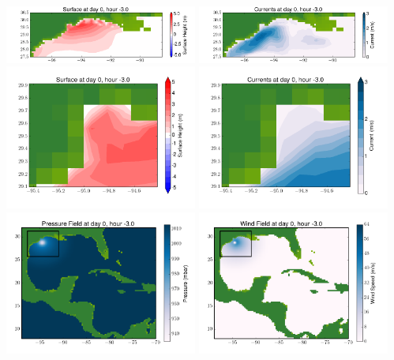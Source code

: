 \documentclass[11pt]{article}
\begin{document}
\includegraphics[width=0.475\textwidth]{frame0069fig4.png}
\vskip 10pt 
\includegraphics[width=0.475\textwidth]{frame0069fig5.png}
\includegraphics[width=0.475\textwidth]{frame0069fig6.png}
\vskip 10pt 
\includegraphics[width=0.475\textwidth]{frame0069fig7.png}
\includegraphics[width=0.475\textwidth]{frame0069fig8.png}
\vskip 10pt 
\includegraphics[width=0.475\textwidth]{frame0069fig9.png}
\end{document}
